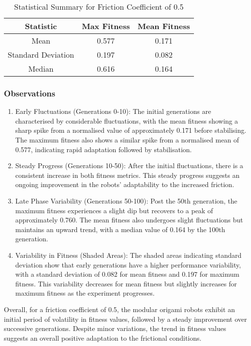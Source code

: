 \documentclass{sigchi}
\begin{document}
\begin{table}[h!]
\centering
\caption{Statistical Summary for Friction Coefficient of 0.5}
\label{tab:stats_0.5}
\begin{tabular}{ccc}
\hline
Statistic & Max Fitness & Mean Fitness \\
\hline
Mean & 0.577 & 0.171 \\
Standard Deviation & 0.197 & 0.082 \\
Median & 0.616 & 0.164 \\
\hline
\end{tabular}
\end{table}

\subsubsection{Observations}
\begin{enumerate}
    \item Early Fluctuations (Generations 0-10): The initial generations are characterised by considerable fluctuations, with the mean fitness showing a sharp spike from a normalised value of approximately 0.171 before stabilising. The maximum fitness also shows a similar spike from a normalised mean of 0.577, indicating rapid adaptation followed by stabilisation.
    \item Steady Progress (Generations 10-50): After the initial fluctuations, there is a consistent increase in both fitness metrics. This steady progress suggests an ongoing improvement in the robots' adaptability to the increased friction.
    \item Late Phase Variability (Generations 50-100): Post the 50th generation, the maximum fitness experiences a slight dip but recovers to a peak of approximately 0.760. The mean fitness also undergoes slight fluctuations but maintains an upward trend, with a median value of 0.164 by the 100th generation.
    \item Variability in Fitness (Shaded Areas): The shaded areas indicating standard deviation show that early generations have a higher performance variability, with a standard deviation of 0.082 for mean fitness and 0.197 for maximum fitness. This variability decreases for mean fitness but slightly increases for maximum fitness as the experiment progresses.
\end{enumerate}

Overall, for a friction coefficient of 0.5, the modular origami robots exhibit an initial period of volatility in fitness values, followed by a steady improvement over successive generations. Despite minor variations, the trend in fitness values suggests an overall positive adaptation to the frictional conditions.
\end{document}
